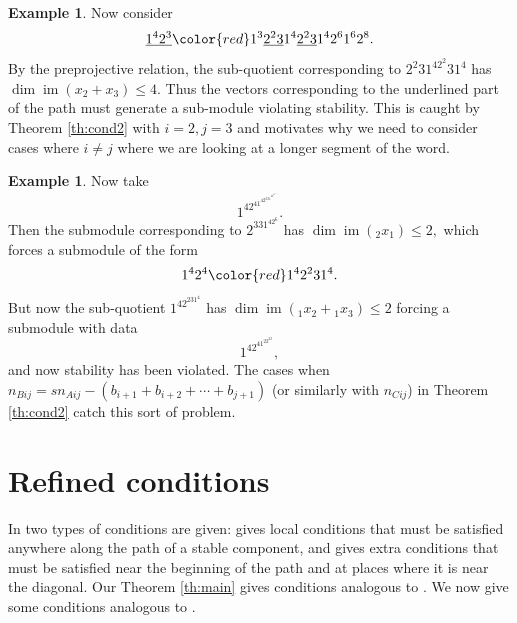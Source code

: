 \documentclass{amsart}
\numberwithin{equation}{section}
\numberwithin{figure}{section}
\numberwithin{table}{section}
\theoremstyle{definition}
\newtheorem{Example}[equation]{Example}
\newcommand{\im}{\operatorname{im}}
\begin{document}
\begin{Example}
	Now consider 
	$$\underline{1^4 2^3} {\color{red}  1^3\underline{2^2 3 } 1^4\underline{ 2^2 3 } 1^4} 2^6 1^6 2^8.$$
	By the preprojective relation, the sub-quotient corresponding to $2^2 3 1^42^2 3 1^4$ has $\dim \im (x_2 +x_3) \leq 4$. 
	Thus the vectors corresponding to the underlined part of the path must generate a sub-module violating stability. 
	This is caught by Theorem \ref{th:cond2} with $i=2, j=3$ and motivates why we need to consider cases where $i\neq j$ where we are looking at a longer segment of the word.  
\end{Example}

\begin{Example}
	Now take 
	$$1^42^41^42^331^42^61^52^6.$$
	Then the submodule corresponding to $2^331^42^6$ has $\dim \im ({}_2x_1) \leq 2,$ which forces a submodule of the form 
	$$1^42^4{\color{red} 1^42^231^4}.$$
	But now the sub-quotient $ 1^42^231^4$ has $\dim \im ({}_1 x_2+ {}_1 x_3) \leq 2$ 
	forcing a submodule with data
	$$1^42^41^22^23,$$
	and now stability has been violated. 
	The cases when $n_{Bij}= sn_{Aij}-(b_{i+1}+b_{i+2}+\cdots+b_{j+1})$ (or similarly with $n_{Cij}$) in Theorem \ref{th:cond2} catch this sort of problem. 
\end{Example}

 
\section{Refined conditions}

In \cite{T21} two types of conditions are given: \cite[Theorem 4.3]{T21} gives local conditions that must be satisfied anywhere along the path of a stable component, and \cite[Theorem 4.9]{T21} gives extra conditions that must be satisfied near the beginning of the path and at places where it is near the diagonal. Our Theorem \ref{th:main} gives conditions analogous to \cite[Theorem 4.3]{T21}. We now give some conditions analogous to \cite[Theorem 4.9]{T21}.
\end{document}
